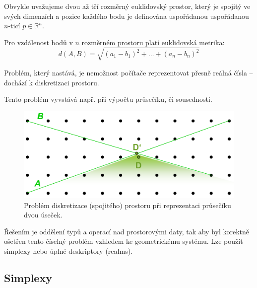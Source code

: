 \begin{compactitem}
    \item Obvykle uvažujeme dvou až tří rozměrný euklidovský prostor, který je spojitý ve svých dimenzích a pozice každého bodu je definována uspořádanou uspořádanou $n$-ticí $p \in \mathbb{R}^n$.

    \item Pro vzdálenost bodů v $n$ rozměrném prostoru platí euklidovská metrika:
    $$ d(A, B) = \sqrt{(a_1 - b_1)^2 + \ldots + (a_n - b_n)^2} $$

    \item Problém, který nastává, je nemožnost počítače reprezentovat přesně reálná čísla -- dochází k diskretizaci prostoru. \begin{compactitem}
        \item Tento problém vyvstává např. při výpočtu průsečíku, či sousednosti.
    \end{compactitem}
    \begin{figure}[H]
        \centering
        \includegraphics[width=0.75\linewidth]{spatial-problem.pdf}
        \caption{Problém diskretizace (spojitého) prostoru při reprezentaci průsečíku dvou úseček.}
    \end{figure}

    \item Řešením je oddělení typů a operací nad prostorovými daty, tak aby byl korektně ošetřen tento číselný problém vzhledem ke geometrickému systému. Lze použít simplexy nebo úplné deskriptory (realms).
\end{compactitem}

\subsection{Simplexy}

